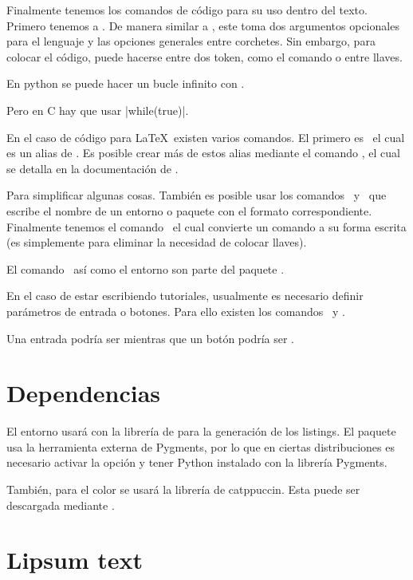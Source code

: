 \documentclass[theme=mocha, pagecolor, pagesize=a5paper, stretchmode=true]{qx-files/qx-notes}
\begin{document}
  Finalmente tenemos los comandos de código para su uso dentro del texto. Primero tenemos a \texcs\codeline. De manera similar a , este toma dos argumentos opcionales para el lenguaje y las opciones generales entre corchetes. Sin embargo, para colocar el código, puede hacerse entre dos token, como el comando \texcs{\verb} o entre llaves.

  \begin{texexample}
    En python se puede hacer un bucle infinito con 
    .

    Pero en C hay que usar \codeline[c]|while(true){}|.
  \end{texexample}


  En el caso de código para \LaTeX\ existen varios comandos. El primero es \texcs\texline\ el cual es un alias de \texline{\codeline[latex]}. Es posible crear más de estos alias mediante el comando \texcs\newmintinline, el cual se detalla en la documentación de .

  Para simplificar algunas cosas. También es posible usar los comandos \texcs\texenvname\ y \texcs\texpkgname\ que escribe el nombre de un entorno o paquete con el formato correspondiente. Finalmente tenemos el comando \texcs\texcs\ el cual convierte un comando a su forma escrita (es simplemente para eliminar la necesidad de colocar llaves).

  \begin{texexample}
    El comando \texcs\mint\ así como el entorno
     son parte del paquete
    .
  \end{texexample}

  En el caso de estar escribiendo tutoriales, usualmente es necesario definir parámetros de entrada o botones. Para ello existen los comandos \texcs{}\ y \texcs\keybutton. 

  \begin{texexample}
    Una entrada podría ser 
    mientras que un botón podría ser .
  \end{texexample}

  \section{Dependencias}

  El entorno  usará  con la librería de  para la generación de los listings. El paquete  usa la herramienta externa de Pygments, por lo que en ciertas distribuciones es necesario activar la opción  y tener Python instalado con la librería Pygments.

  También, para el color se usará la librería de catppuccin. Esta puede ser descargada mediante .




  \section{Lipsum text}

  \lipsum
\end{document}
